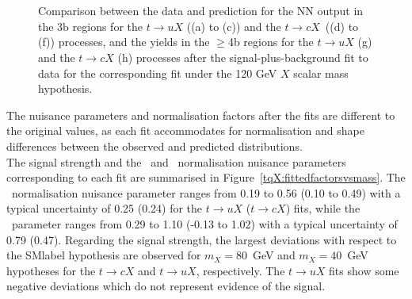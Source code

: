\begin{figure}[htb]
    \RawFloats
    \centering
     \\
     \\ 
    \caption{Comparison between the data and prediction for the NN output in the 3b regions for the $t\to uX$ ((a) to (c))
    and the $t\to cX$\ ((d) to (f)) processes, 
    and the yields in the $\geq$4b regions for the $t\to uX$ (g) and the $t\to cX$ (h) processes 
    after the signal-plus-background fit to data for the corresponding fit under the 120 GeV $X$ scalar mass hypothesis.}
    \label{tqX:NNfit120}
\end{figure}


\clearpage

The nuisance parameters and normalisation factors after the fits are different to the original values, as each fit accommodates for normalisation and shape differences between the observed and predicted distributions.\\

The signal strength and the \ttb\ and \ttc\ normalisation nuisance parameters corresponding to each fit are summarised in Figure~\ref{tqX:fittedfactorsvsmass}. The \ttb\ normalisation nuisance parameter ranges from 0.19 to 0.56 (0.10 to 0.49) with a typical uncertainty of 0.25 (0.24) for the $t\to uX$ ($t\to cX$) fits, while the \ttc\ parameter ranges from 0.29 to 1.10 (-0.13 to 1.02) with a typical uncertainty of 0.79 (0.47). Regarding the signal strength, the largest deviations with respect to the \acrshort{SMlabel} hypothesis are observed for $m_X=80$~GeV  and $m_X=40$~GeV hypotheses for the $t\to cX$ and $t\to uX$, respectively. The $t\to uX$ fits show some negative deviations which do not represent evidence of the signal.\\

